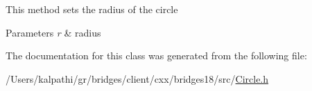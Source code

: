 This method sets the radius of the circle


\begin{DoxyParams}{Parameters}
{\em r} & radius \\
\hline
\end{DoxyParams}


The documentation for this class was generated from the following file\+:\begin{DoxyCompactItemize}
\item 
/\+Users/kalpathi/gr/bridges/client/cxx/bridges18/src/\mbox{\hyperlink{_circle_8h}{Circle.\+h}}\end{DoxyCompactItemize}
